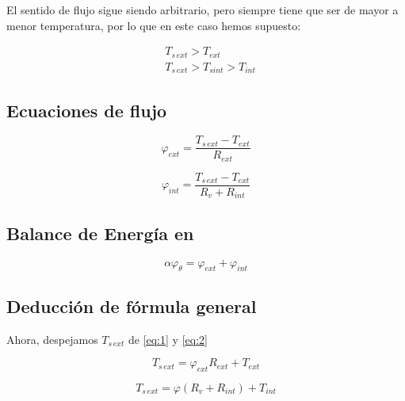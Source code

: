 \documentclass[12pt]{article}
\begin{document}
El sentido de flujo sigue siendo arbitrario, pero siempre tiene que ser de mayor a menor temperatura, por lo que en este caso hemos supuesto:

\[ \begin{aligned} 
    & T_{ s \, ext } > T_{ ext } \\
    & T_{ s \, ext } > T_{ s int } > T_{ int }
\end{aligned} \]

\subsection{Ecuaciones de flujo}

\begin{equation}\label{eq:1}
    \varphi _{ ext } = \frac{ T_{ s \, ext } - T_{ ext } }{ R_{ ext } }
\end{equation}

\begin{equation}\label{eq:2}
    \varphi _{ int } = \frac{ T_{ s \, ext } - T_{ ext } }{ R_v + R_{ int } }
\end{equation}


\subsection{Balance de Energía en}

\begin{equation}\label{eq:3}
    \alpha \varphi _\theta = \varphi _{ ext } + \varphi _{ int }
\end{equation}

\subsection{Deducción de fórmula general}

Ahora, despejamos $ T_{ s \, ext } $ de \ref{eq:1} y \ref{eq:2}

\begin{equation} \label{eq:4}
    T_{ s \, ext} = \varphi _{ ext } R_{ ext } + T_{ ext }
\end{equation}

\begin{equation} \label{eq:5}
    T_{ s \, ext } = \varphi \left( R_v + R_{ int } \right) + T_{ int }
\end{equation}
\end{document}
